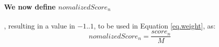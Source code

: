 


\paragraph{We now define $nomalizedScore_n$}, resulting in a value in $-1..1$,  to be used in Equation \ref{eq.weight}, as: 
\begin{equation} 
\label{eq.normalizedscore}
nomalizedScore_n =  \frac{score_n}{M} 
\end{equation}
 








